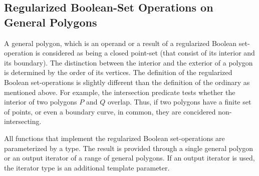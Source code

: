\subsection{Regularized Boolean-Set Operations on General Polygons}
\label{bobs_ssec:regularized_bops}
A general polygon, which is an operand or a result of a regularized
Boolean set-operation is considered as being a closed point-set (that
consist of its interior and its boundary). The distinction between the
interior and  the exterior of a polygon is determined by the order of
its vertices. The definition of the regularized Boolean set-operations 
is slightly different than the definition of the ordinary as mentioned
above. For example, the intersection predicate tests whether the
interior of two polygons $P$ and $Q$ overlap. Thus, if two polygons
have a finite set of points, or even a boundary curve, in common, they
are concidered non-intersecting.

All functions that implement the regularized Boolean set-operations
are parameterized by a  type. The
result is provided through a single general polygon or an output
iterator of a range of general polygons. If  an output iterator is
used, the iterator type is an additional template parameter.

